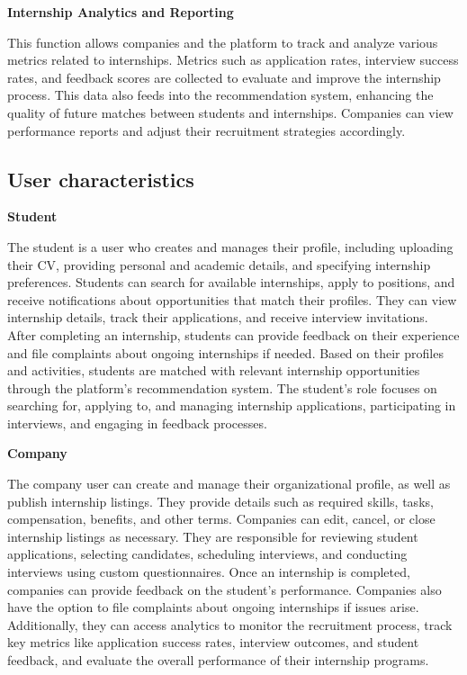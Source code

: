 \textbf{Internship Analytics and Reporting}

This function allows companies and the platform to track and analyze various metrics related to internships. Metrics such as application rates, interview success rates, and feedback scores are collected to evaluate and improve the internship process. This data also feeds into the recommendation system, enhancing the quality of future matches between students and internships. Companies can view performance reports and adjust their recruitment strategies accordingly.
\subsection{User characteristics}

\textbf{Student}

The student is a user who creates and manages their profile, including uploading their CV, providing personal and academic details, and specifying internship preferences. Students can search for available internships, apply to positions, and receive notifications about opportunities that match their profiles. They can view internship details, track their applications, and receive interview invitations. After completing an internship, students can provide feedback on their experience and file complaints about ongoing internships if needed. Based on their profiles and activities, students are matched with relevant internship opportunities through the platform’s recommendation system. The student’s role focuses on searching for, applying to, and managing internship applications, participating in interviews, and engaging in feedback processes.

\textbf{Company}

The company user can create and manage their organizational profile, as well as publish internship listings. They provide details such as required skills, tasks, compensation, benefits, and other terms. Companies can edit, cancel, or close internship listings as necessary. They are responsible for reviewing student applications, selecting candidates, scheduling interviews, and conducting interviews using custom questionnaires. Once an internship is completed, companies can provide feedback on the student’s performance. Companies also have the option to file complaints about ongoing internships if issues arise. Additionally, they can access analytics to monitor the recruitment process, track key metrics like application success rates, interview outcomes, and student feedback, and evaluate the overall performance of their internship programs.
